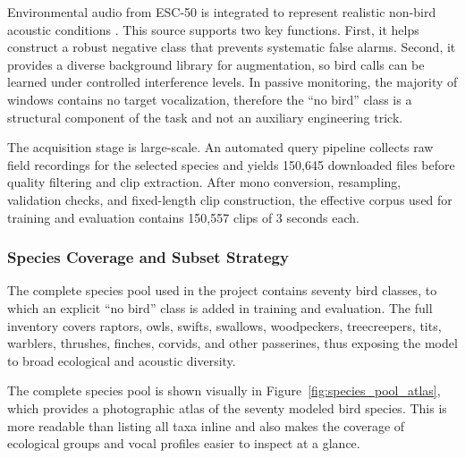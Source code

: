 \documentclass[a4paper,singleside,12pt]{report} %
\begin{document}
	Environmental audio from ESC-50 is integrated to represent realistic non-bird acoustic conditions \cite{esc50}. This source supports two key functions. First, it helps construct a robust negative class that prevents systematic false alarms. Second, it provides a diverse background library for augmentation, so bird calls can be learned under controlled interference levels. In passive monitoring, the majority of windows contains no target vocalization, therefore the ``no bird'' class is a structural component of the task and not an auxiliary engineering trick.

	The acquisition stage is large-scale. An automated query pipeline collects raw field recordings for the selected species and yields 150,645 downloaded files before quality filtering and clip extraction. After mono conversion, resampling, validation checks, and fixed-length clip construction, the effective corpus used for training and evaluation contains 150,557 clips of 3 seconds each.

	\subsubsection{Species Coverage and Subset Strategy}
	The complete species pool used in the project contains seventy bird classes, to which an explicit ``no bird'' class is added in training and evaluation. The full inventory covers raptors, owls, swifts, swallows, woodpeckers, treecreepers, tits, warblers, thrushes, finches, corvids, and other passerines, thus exposing the model to broad ecological and acoustic diversity.

	The complete species pool is shown visually in Figure~\ref{fig:species_pool_atlas}, which provides a photographic atlas of the seventy modeled bird species. This is more readable than listing all taxa inline and also makes the coverage of ecological groups and vocal profiles easier to inspect at a glance.

	\clearpage
	
	\clearpage
\end{document}
